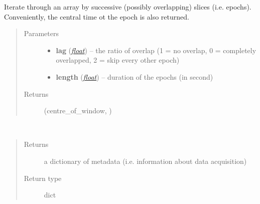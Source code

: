 \documentclass[letterpaper,10pt,english]{sphinxmanual}
\begin{document}
\begin{fulllineitems}
\begin{fulllineitems}
\label{pyrem.time_series:pyrem.time_series.BiologicalTimeSeries.iter_window}
Iterate through an array by successive (possibly overlapping) slices (i.e. epochs).
Conveniently, the central time ot the epoch is also returned.
\begin{quote}\begin{description}
\item[{Parameters}] \leavevmode\begin{itemize}
\item {} 
\textbf{lag} (\href{http://docs.python.org/2.7/library/functions.html\#float}{\emph{float}}) -- the ratio of overlap (1 = no overlap, 0 = completely overlapped, 2 = skip every other epoch)

\item {} 
\textbf{length} (\href{http://docs.python.org/2.7/library/functions.html\#float}{\emph{float}}) -- duration of the epochs (in second)

\end{itemize}

\item[{Returns}] \leavevmode
(centre\_of\_window, {\hyperref[pyrem.time_series:pyrem.time_series.BiologicalTimeSeries]{}})

\end{description}\end{quote}

\end{fulllineitems}


\begin{fulllineitems}
\label{pyrem.time_series:pyrem.time_series.BiologicalTimeSeries.metadata}~\begin{quote}\begin{description}
\item[{Returns}] \leavevmode
a dictionary of metadata (i.e. information about data acquisition)

\item[{Return type}] \leavevmode
dict

\end{description}\end{quote}

\end{fulllineitems}


\end{fulllineitems}
\end{document}
